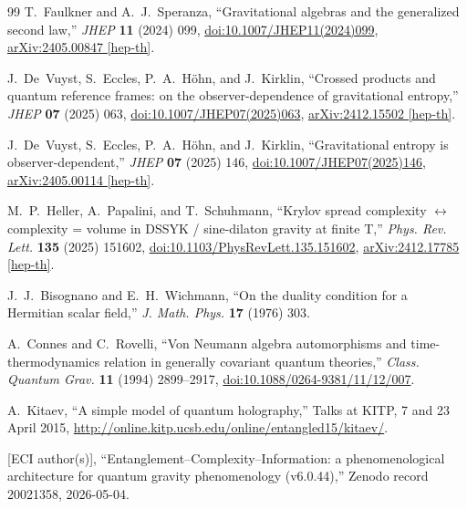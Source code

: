 \documentclass[12pt,a4paper]{article}
\begin{document}
\begin{thebibliography}{99}
T.~Faulkner and A.~J.~Speranza,
``Gravitational algebras and the generalized second law,''
\textit{JHEP} \textbf{11} (2024) 099,
\href{https://doi.org/10.1007/JHEP11(2024)099}{doi:10.1007/JHEP11(2024)099},
\href{https://arxiv.org/abs/2405.00847}{arXiv:2405.00847 [hep-th]}.

J.~De~Vuyst, S.~Eccles, P.~A.~H\"{o}hn, and J.~Kirklin,
``Crossed products and quantum reference frames: on the observer-dependence
of gravitational entropy,''
\textit{JHEP} \textbf{07} (2025) 063,
\href{https://doi.org/10.1007/JHEP07(2025)063}{doi:10.1007/JHEP07(2025)063},
\href{https://arxiv.org/abs/2412.15502}{arXiv:2412.15502 [hep-th]}.

J.~De~Vuyst, S.~Eccles, P.~A.~H\"{o}hn, and J.~Kirklin,
``Gravitational entropy is observer-dependent,''
\textit{JHEP} \textbf{07} (2025) 146,
\href{https://doi.org/10.1007/JHEP07(2025)146}{doi:10.1007/JHEP07(2025)146},
\href{https://arxiv.org/abs/2405.00114}{arXiv:2405.00114 [hep-th]}.

M.~P.~Heller, A.~Papalini, and T.~Schuhmann,
``Krylov spread complexity $\leftrightarrow$ complexity = volume in DSSYK / sine-dilaton gravity at finite T,''
\textit{Phys. Rev. Lett.} \textbf{135} (2025) 151602,
\href{https://doi.org/10.1103/PhysRevLett.135.151602}{doi:10.1103/PhysRevLett.135.151602},
\href{https://arxiv.org/abs/2412.17785}{arXiv:2412.17785 [hep-th]}.

J.~J.~Bisognano and E.~H.~Wichmann,
``On the duality condition for a Hermitian scalar field,''
\textit{J. Math. Phys.} \textbf{17} (1976) 303.

A.~Connes and C.~Rovelli,
``Von Neumann algebra automorphisms and time-thermodynamics relation in
generally covariant quantum theories,''
\textit{Class. Quantum Grav.} \textbf{11} (1994) 2899--2917,
\href{https://doi.org/10.1088/0264-9381/11/12/007}{doi:10.1088/0264-9381/11/12/007}.

A.~Kitaev, ``A simple model of quantum holography,''
Talks at KITP, 7 and 23 April 2015,
\url{http://online.kitp.ucsb.edu/online/entangled15/kitaev/}.

[ECI author(s)],
``Entanglement--Complexity--Information: a phenomenological architecture
for quantum gravity phenomenology (v6.0.44),''
Zenodo record 20021358, 2026-05-04.


\end{thebibliography}
\end{document}
